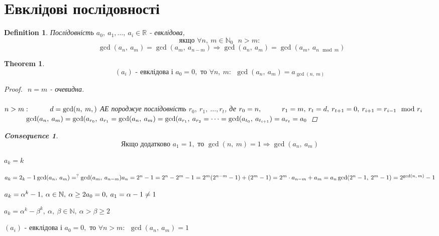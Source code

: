 \documentclass[a4paper,12pt, centered]{bookest}
\newtheorem{theorem}{Theorem}[section]
\newtheorem{definition}{Definition}[section]
\newtheorem*{cons*}{Consequence}
\newcommand\tab[1][1cm]{\hspace*{#1}}
\begin{document}
\section{Eвклідові послідовності}
\begin{definition}
Послідовність $a_0,\>a_1,\dots,\>a_i\in\mathbb{R}$ - евклідова,  $$\textrm{якщо } \forall n,\>m\in\mathbb{N}_0\
\>\>n>m:$$$$\>\>\gcd(a_n,\>a_m)=\gcd(a_m,\>a_{n-m})\Rightarrow\gcd(a_n,\>a_m)=\gcd(a_m,\>a_{n\mod m})$$
\end{definition}
\begin{theorem}
	$$(a_i)\textrm{ - евклідова і } a_0=0,\textrm{ то }\forall n,\>m:\>\>\gcd(a_n,\>a_m)=a_{\gcd(n,\>m)}$$
	\begin{proof}$ $
		$n=m$ - очевидна.\\\\
		$n>m:\\\tab d=\gcd(n,\>m,)$ АЕ породжуе послідовність $r_0,\>r_1,\>\dots,r_t$, де $r_0=n,\\\tab r_1=m,\>r_t=d,\>r_{t+1}=0,\>r_{i+1}=r_{i-1}\mod r_i$ $\\\tab \gcd(a_n,\>a_m)=\gcd(a_{r_0},\>a_{r_1}=\gcd(a_n,\>a_m)=\gcd(a_{r_1},\>a_{r_2}=\dots=\gcd(a_{t_0},\>a_{t_{i+1}})=a_{r_t}=a_0$
	\end{proof}
	\begin{cons*}$ $
		$$\textrm{Якщо додатково }a_1=1,\textrm{ то }\gcd(n,\>m)=1\Rightarrow\gcd(a_n,\>a_m)$$
	\end{cons*}
\end{theorem}
\begin{example}
	$a_k=k$	
\end{example}
\begin{example}
	$a_k=2_k-1\\\gcd(a_n,\>a_m)=^{?}\gcd(a_m,\>a_{n-m})\\a_n=2^n-1=2^n-2^m-1=2^m(2^{n-m}-1)+(2^m-1)=2^m\cdot a_{n-m}+a_m=a_n\\\gcd(2^n-1,\>2^m-1)=2^{\gcd(n,\>m)}-1$	
\end{example}
\begin{example}
	$a_k=\alpha^k-1,\>\alpha\in\mathbb{N},\>\alpha\geq 2\\a_0=0,\>a_1=\alpha-1\neq 1$	
\end{example}
\begin{example}
	$a_k=\alpha^k-\beta^k,\>\alpha,\>\beta\in\mathbb{N},\>\alpha>\beta\geq 2$	
\end{example}
$(a_i)\textrm{ - евклідова і } a_0=0,\textrm{ то }\forall n>m:\>\>\gcd(a_n,\>a_m)=1$
\let\cleardoublepage\clearpage
\end{document}
